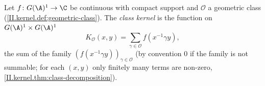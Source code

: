 Let $f\colon G(\A)^1\to\C$ be continuous with compact support and $\mathcal O$ a geometric class (\cref{II.kernel.def:geometric-class}). The
\emph{class kernel} is the function on $G(\A)^1\times G(\A)^1$
\[
  K_{\mathcal O}(x,y)=\sum_{\gamma\in\mathcal O}f(x^{-1}\gamma y),
\]
the sum of the family $(f(x^{-1}\gamma y))_{\gamma\in\mathcal O}$ (by convention $0$ if the family is not summable; for each $(x,y)$ only finitely many
terms are non-zero, \cref{II.kernel.thm:class-decomposition}).

